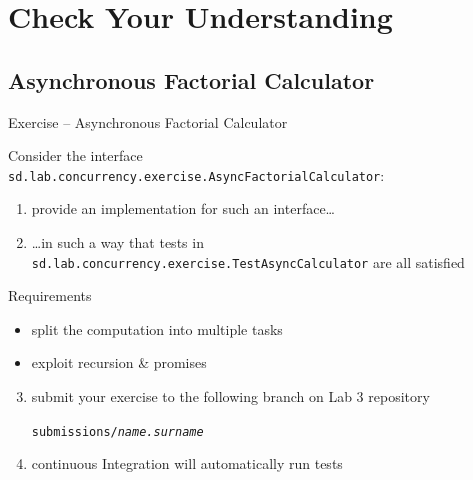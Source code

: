 \documentclass{beamer}\mode<presentation>{\usetheme{AMSBolognaFC}}
\begin{document}
\section{Check Your Understanding}

\startExercise

\subsection{Asynchronous Factorial Calculator}

\begin{frame}[c,allowframebreaks]{Exercise \currentExercise{} -- Asynchronous Factorial Calculator}

	Consider the interface \texttt{sd.lab.concurrency.exercise.\alert{AsyncFactorialCalculator}}:
	\bigskip
	
	\bigskip
	\begin{enumerate}
		\item provide an implementation for such an interface\ldots

		\bigskip

		\item \ldots in such a way that tests in \texttt{sd.lab\allowbreak{}.concurrency\allowbreak{}.exercise\allowbreak{}.\alert{TestAsyncCalculator}} are all satisfied

	\end{enumerate}

    \framebreak

	\begin{block}{Requirements}
		\begin{itemize}
			\item split the computation into multiple tasks
			\item exploit recursion \& promises
		\end{itemize}
	\end{block}

	\bigskip

    \begin{enumerate}\setcounter{enumi}{2}

		\item submit your exercise to the following branch on Lab 3 repository
		\begin{center}
			\texttt{submissions/\textit{name.surname}}
		\end{center}

		\bigskip

		\item continuous Integration will automatically run tests
	\end{enumerate}

\end{frame}
\end{document}
